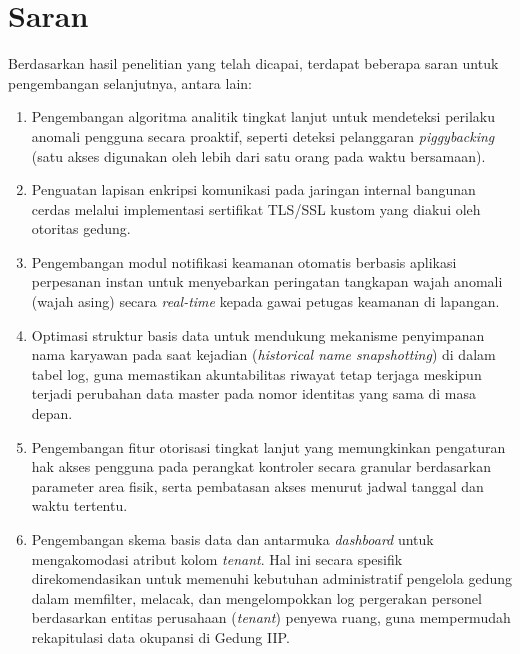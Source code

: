 \section{Saran}
Berdasarkan hasil penelitian yang telah dicapai, terdapat beberapa saran untuk pengembangan selanjutnya, antara lain:
\begin{enumerate}
    \item Pengembangan algoritma analitik tingkat lanjut untuk mendeteksi perilaku anomali pengguna secara proaktif, seperti deteksi pelanggaran \textit{piggybacking} (satu akses digunakan oleh lebih dari satu orang pada waktu bersamaan).
    \item Penguatan lapisan enkripsi komunikasi pada jaringan internal bangunan cerdas melalui implementasi sertifikat TLS/SSL kustom yang diakui oleh otoritas gedung.
    \item Pengembangan modul notifikasi keamanan otomatis berbasis aplikasi perpesanan instan untuk menyebarkan peringatan tangkapan wajah anomali (wajah asing) secara \textit{real-time} kepada gawai petugas keamanan di lapangan.
    \item Optimasi struktur basis data untuk mendukung mekanisme penyimpanan nama karyawan pada saat kejadian (\textit{historical name snapshotting}) di dalam tabel log, guna memastikan akuntabilitas riwayat tetap terjaga meskipun terjadi perubahan data master pada nomor identitas yang sama di masa depan.
    \item Pengembangan fitur otorisasi tingkat lanjut yang memungkinkan pengaturan hak akses pengguna pada perangkat kontroler secara granular berdasarkan parameter area fisik, serta pembatasan akses menurut jadwal tanggal dan waktu tertentu.
    \item Pengembangan skema basis data dan antarmuka \textit{dashboard} untuk mengakomodasi atribut kolom \textit{tenant}. Hal ini secara spesifik direkomendasikan untuk memenuhi kebutuhan administratif pengelola gedung dalam memfilter, melacak, dan mengelompokkan log pergerakan personel berdasarkan entitas perusahaan (\textit{tenant}) penyewa ruang, guna mempermudah rekapitulasi data okupansi di Gedung IIP.
\end{enumerate}
